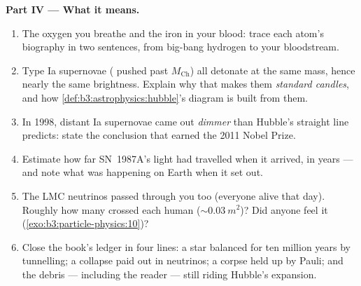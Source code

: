 \begin{problem}
\medskip\noindent\textbf{Part IV --- What it means.}

\begin{enumerate}[resume]
  \item The oxygen you breathe and the iron in your blood:
        trace each atom's biography in two sentences, from
        big-bang hydrogen to your bloodstream.
  \item Type Ia supernovae ( pushed past
        $M_{\text{Ch}}$) all detonate at the same mass, hence
        nearly the same brightness. Explain why that makes them
        \emph{standard candles}, and how
        \cref{def:b3:astrophysics:hubble}'s diagram is built
        from them.
  \item In 1998, distant Ia supernovae came out \emph{dimmer}
        than Hubble's straight line predicts: state the
        conclusion that earned the 2011 Nobel Prize.
  \item Estimate how far SN~1987A's light had travelled when it
        arrived, in years --- and note what was happening on
        Earth when it set out.
  \item The LMC neutrinos passed through you too (everyone
        alive that day). Roughly how many crossed each human
        (${\sim}\qty{0.03}{m^2}$)? Did anyone feel it
        (\cref{exo:b3:particle-physics:10})?
  \item Close the book's ledger in four lines: a star balanced
        for ten million years by tunnelling; a collapse paid
        out in neutrinos; a corpse held up by Pauli; and the
        debris --- including the reader --- still riding
        Hubble's expansion.
\end{enumerate}
\end{problem}
